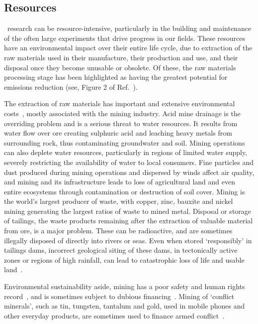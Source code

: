 \documentclass[../SustainableHEP.tex]{subfiles}
\begin{document}
\subsection{Resources}
\label{subsec:Resources}

\ACR\ research can be resource-intensive, particularly in the building and maintenance of the often large experiments that drive progress in our fields.  These resources have an environmental impact over their entire life cycle, due to extraction of the raw materials used in their manufacture, their production and use, and their disposal once they become unusable or obsolete. Of these, the raw materials processing stage has been highlighted as having the greatest potential for emissions reduction (see, \eg Figure 2 of Ref.~\cite{EURaw}).  

The extraction of raw materials has important and extensive environmental costs~\cite{Dolega:2016}, mostly associated with the mining industry.  Acid mine drainage is the overriding problem and is a serious threat to water resources.  It results from water flow over ore creating sulphuric acid and leaching heavy metals from surrounding rock, thus contaminating groundwater and soil.  Mining operations can also deplete water resources, particularly in regions of limited water supply, severely restricting the availability of water to local consumers.  Fine particles and dust produced during mining operations and dispersed by winds affect air quality, and mining and its infrastructure leads to loss of agricultural land and even entire ecosystems through contamination or destruction of soil cover. Mining is the world's largest producer of waste, with copper, zinc, bauxite and nickel mining generating the largest ratios of waste to mined metal.  Disposal or storage of tailings, the waste products remaining after the extraction of valuable material from ore, is a major problem. These can be radioactive, and are sometimes illegally disposed of directly into rivers or seas.  Even when stored `responsibly' in tailings dams, incorrect geological siting of these dams, in tectonically active zones or regions of high rainfall, can lead to catastrophic loss of life and usable land~\cite{SILVAROTTA2020102119}.

Environmental sustainability aside, mining has a poor safety and human rights record~\cite{ResponsibleMiningIndex}, and is sometimes subject to dubious financing~\cite{MiningandMoneyLaundering}.  Mining of `conflict minerals', such as tin, tungsten, tantalum and gold, used in mobile phones and other everyday products, are sometimes used to finance armed conflict~\cite{EUConflictMinerals}.  
\end{document}
